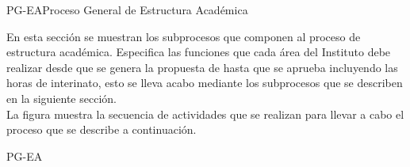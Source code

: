 

\begin{procesoGeneral}{PG-EA}{Proceso General de Estructura Académica} {
		
	En esta sección se muestran los subprocesos que componen al proceso de estructura académica. Especifica las funciones que cada área del Instituto debe realizar desde que se genera la propuesta de  hasta que se aprueba incluyendo las horas de interinato, esto se lleva acabo mediante los subprocesos que se describen en la siguiente sección.\\
					
	La figura  muestra la secuencia de actividades que se realizan para llevar a cabo el proceso que se describe a continuación.
		
	}{PG-EA}

\end{procesoGeneral}

